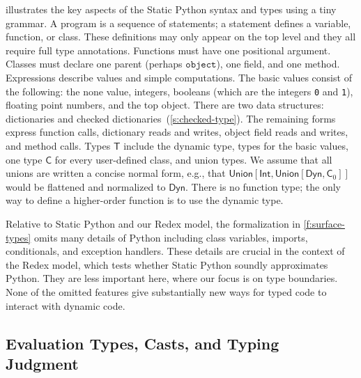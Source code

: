 \documentclass[english,cleveref,submission]{programming}
\newcommand{\SP}{Static Python}
\newcommand{\code}[1]{\texttt{#1}}
\newcommand{\typefont}[1]{\mathsf{#1}}
\newcommand{\paramtype}[2]{#1[#2]}
\newcommand{\sptype}{\typefont{T}}
\newcommand{\sptclass}{\typefont{C}}
\newcommand{\sptint}{\typefont{Int}}
\newcommand{\sptdyn}{\typefont{Dyn}}
\newcommand{\sptunion}[1]{\paramtype{\typefont{Union}}{#1}}
\newcommand{\spobject}{\code{object}}
\begin{document}
 illustrates the key aspects of the \SP{} syntax and types
using a tiny grammar.
A program is a sequence of statements;
a statement defines a variable, function, or class.
These definitions may only appear on the top level
and they all require full type annotations.
Functions must have one positional argument.
Classes must declare one parent (perhaps $\spobject$), one field, and one method.
Expressions describe values and simple computations.
The basic values consist of the following: the none value, integers,
booleans (which are the integers \code{0} and \code{1}), floating point numbers, and the top object.
There are two data structures: dictionaries and checked dictionaries~(\cref{s:checked-type}).
The remaining forms express function calls, dictionary reads and writes, object field reads and writes,
and method calls.
Types $\sptype$ include the dynamic type, types for the basic values, one type $\sptclass$ for every
user-defined class, and union types.
We assume that all unions are written a concise normal form, e.g., that
$\sptunion{\sptint, \sptunion{\sptdyn, \sptclass_0}}$ would be flattened and normalized to $\sptdyn$.
There is no function type; the only way to define a higher-order function is to use the dynamic type.


Relative to \SP{} and our Redex model, the formalization in \cref{f:surface-types} omits
many details of Python including class variables, imports, conditionals, and exception handlers.
These details are crucial in the context of the Redex model, which tests whether \SP{}
soundly approximates Python.
They are less important here, where our focus is on type boundaries.
None of the omitted features give substantially new ways for typed code to interact with dynamic code.


\subsection{Evaluation Types, Casts, and Typing Judgment}
\end{document}
